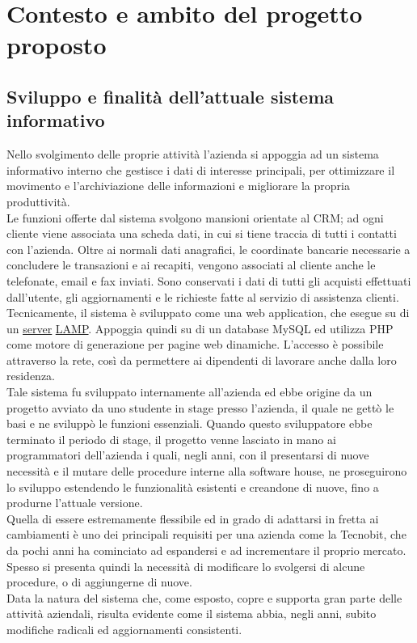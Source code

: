 \chapter{Contesto e ambito del progetto proposto}
\section{Sviluppo e finalit\` a dell'attuale sistema informativo}
Nello svolgimento delle proprie attivit\`a l'azienda si appoggia ad un sistema informativo interno che gestisce i dati di interesse principali, per ottimizzare il movimento e l'archiviazione delle informazioni e migliorare la propria produttivit\`a. \\
Le funzioni offerte dal sistema svolgono mansioni orientate al CRM; ad ogni cliente viene associata una scheda dati, in cui si tiene traccia di tutti i contatti con l'azienda. Oltre ai normali dati anagrafici, le coordinate bancarie necessarie a concludere le transazioni e ai recapiti, vengono associati al cliente anche le telefonate, email e fax inviati. Sono conservati i dati di tutti gli acquisti effettuati dall'utente, gli aggiornamenti e le richieste fatte al servizio di assistenza clienti. \\
Tecnicamente, il sistema \`e sviluppato come una web application, che esegue su di un \hyperlink{server}{\underline{server}} \hyperlink{lamp}{\underline{LAMP}}. Appoggia quindi su di un database MySQL ed utilizza PHP come motore di generazione per pagine web dinamiche. L'accesso \`e possibile attraverso la rete, cos\`i da permettere ai dipendenti di lavorare anche dalla loro residenza. \\
Tale sistema fu sviluppato internamente all'azienda ed ebbe origine da un progetto avviato da uno studente in stage presso l'azienda, il quale ne gett\`o le basi e ne svilupp\`o le funzioni essenziali. Quando questo sviluppatore ebbe terminato il periodo di stage, il progetto venne lasciato in mano ai programmatori dell'azienda i quali, negli anni, con il presentarsi di nuove necessit\`a e il mutare delle procedure interne alla software house, ne proseguirono lo sviluppo estendendo le funzionalit\`a esistenti e creandone di nuove, fino a produrne l'attuale versione. \\
Quella di essere estremamente flessibile ed in grado di adattarsi in fretta ai cambiamenti \`e uno dei principali requisiti per una azienda come la Tecnobit, che da pochi anni ha cominciato ad espandersi e ad incrementare il proprio mercato. Spesso si presenta quindi la necessit\`a di modificare lo svolgersi di alcune procedure, o di aggiungerne di nuove. \\
Data la natura del sistema che, come esposto, copre e supporta gran parte delle attivit\`a aziendali, risulta evidente come il sistema abbia, negli anni, subito modifiche radicali ed aggiornamenti consistenti.


